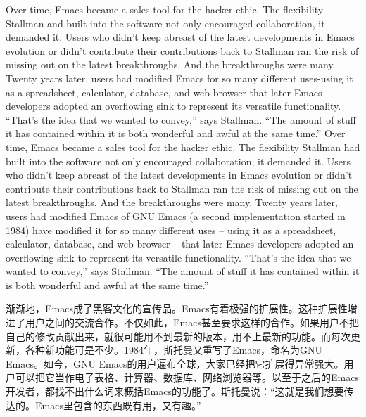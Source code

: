 \ifdefined\eng
\ifdefined\vone
Over time, Emacs became a sales tool for the hacker ethic. The flexibility Stallman and built into the software not only encouraged collaboration, it demanded it. Users who didn't keep abreast of the latest developments in Emacs evolution or didn't contribute their contributions back to Stallman ran the risk of missing out on the latest breakthroughs. And the breakthroughs were many. Twenty years later, users had modified Emacs for so many different uses-using it as a spreadsheet, calculator, database, and web browser-that later Emacs developers adopted an overflowing sink to represent its versatile functionality. ``That's the idea that we wanted to convey,'' says Stallman. ``The amount of stuff it has contained within it is both wonderful and awful at the same time.''
\fi
\ifdefined\vtwo
Over time, Emacs became a sales tool for the hacker ethic. The flexibility Stallman had built into the software not only encouraged collaboration, it demanded it. Users who didn't keep abreast of the latest developments in Emacs evolution or didn't contribute their contributions back to Stallman ran the risk of missing out on the latest breakthroughs. And the breakthroughs were many. Twenty years later, users \ifdefined\vone had modified Emacs \fi\ifdefined\vtwo of GNU Emacs (a second implementation started in 1984) have modified \fi it for so many different uses -- using it as a spreadsheet, calculator, database, and web browser -- that later Emacs developers adopted an overflowing sink to represent its versatile functionality. ``That's the idea that we wanted to convey,'' says Stallman. ``The amount of stuff it has contained within it is both wonderful and awful at the same time.''
\fi
\fi

\ifdefined\chs
渐渐地，Emacs成了黑客文化的宣传品。Emacs有着极强的扩展性。这种扩展性增进了用户之间的交流合作。不仅如此，Emacs甚至要求这样的合作。如果用户不把自己的修改贡献出来，就很可能用不到最新的版本，用不上最新的功能。而每次更新，各种新功能可是不少。\ifdefined\vtwo 1984年，斯托曼又重写了Emacs，命名为GNU Emacs。\fi 如今，GNU Emacs的用户遍布全球，大家已经把它扩展得异常强大。用户可以把它当作电子表格、计算器、数据库、网络浏览器等。以至于之后的Emacs开发者，都找不出什么词来概括Emacs的功能了。斯托曼说：``这就是我们想要传达的。Emacs里包含的东西既有用，又有趣。''
\fi


